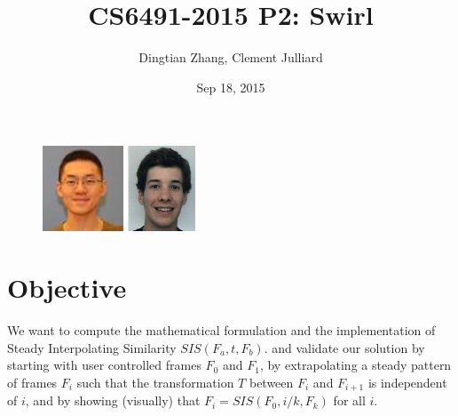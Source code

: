 \documentclass[twoside,11pt]{article}
\begin{document}
\title{CS6491-2015 P2: Swirl}
\author{Dingtian Zhang, Clement Julliard}
\date{Sep 18, 2015}
\maketitle
\begin{figure} [H]
    \centering
    \includegraphics[height=1.0in]{pic_alan}
    \includegraphics[height=1.0in]{pic_clement}
\end{figure}




\section{Objective}

We want to compute the mathematical formulation and the implementation of Steady Interpolating Similarity $SIS(F_a,t,F_b)$. and validate our solution by starting with user controlled frames $F_0$ and $F_1$, by extrapolating a steady pattern of frames $F_i$ such that the transformation $T$ between $F_i$ and $F_{i+1}$ is independent of $i$, and by showing (visually) that $F_i = SIS(F_0,i/k,F_k)$ for all $i$.
\end{document}

